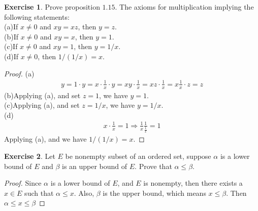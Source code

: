\documentclass[12pt]{extarticle}
\newcommand{\<}{\langle}
\renewcommand{\>}{\rangle}
\theoremstyle{definition}
\newtheorem{exercise}{Exercise}
\begin{document}
\medskip

\begin{exercise}\label{ex3}
Prove proposition $1.15$. The axioms for multiplication implying the following statements: \\
\hspace*{3em}(a)If $x\neq 0$ and $xy=xz$, then $y=z$.\\
\hspace*{3em}(b)If $x\neq 0$ and $xy=x$, then $y=1$.\\
\hspace*{3em}(c)If $x\neq 0$ and $xy=1$, then $y=1/x$.\\
\hspace*{3em}(d)If $x\neq 0$, then $1/(1/x) = x$.
\end{exercise}
\begin{proof}
(a)\begin{align*}
    y = 1\cdot y = x \cdot \frac{1}{x}\cdot y = x y \cdot \frac{1}{x} = xz \cdot \frac{1}{x} = x\frac{1}{x}\cdot z = z
\end{align*}
\hspace*{3em}(b)Applying (a), and set $z = 1$, we have $y=1$.\\
\hspace*{3em}(c)Applying (a), and set $z = 1/x$, we have $y=1/x$.\\
\hspace*{3em}(d)
\begin{align*}
    x \cdot \frac{1}{x} = 1 \Rightarrow \frac{1}{x} \frac{1}{\frac{1}{x}} = 1
\end{align*}
Applying (a), and we have $1/(1/x) = x$.
\end{proof}

\medskip

\begin{exercise}\label{ex4}
Let $E$ be nonempty subset of an ordered set, suppose $\alpha$ is a lower bound of $E$ and $\beta$ is an upper bound of $E$. Prove that $\alpha \leq \beta$.
\end{exercise}
\begin{proof}
Since $\alpha$ is a lower bound of $E$, and $E$ is nonempty, then there exists a $x\in E$ such that $\alpha \leq x$. Also, $\beta$ is the upper bound, which means $x\leq \beta$. Then $\alpha \leq x \leq \beta$
\end{proof}


\medskip
\end{document}
